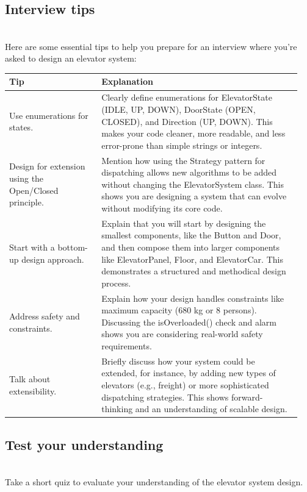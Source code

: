 \subsection{Interview tips}\label{GfHryhjT5altWo7oqo-Nh}
\\
Here are some essential tips to help you prepare for an interview where you're asked to design an elevator system:

\begin{center}
\begin{tabular}{|p{0.3\linewidth}|p{0.65\linewidth}|}
\hline
\textbf{Tip} & \textbf{Explanation} \\
\hline
Use enumerations for states. & Clearly define enumerations for ElevatorState (IDLE, UP, DOWN), DoorState (OPEN, CLOSED), and Direction (UP, DOWN). This makes your code cleaner, more readable, and less error-prone than simple strings or integers. \\
\hline
Design for extension using the Open/Closed principle. & Mention how using the Strategy pattern for dispatching allows new algorithms to be added without changing the ElevatorSystem class. This shows you are designing a system that can evolve without modifying its core code. \\
\hline
Start with a bottom-up design approach. & Explain that you will start by designing the smallest components, like the Button and Door, and then compose them into larger components like ElevatorPanel, Floor, and ElevatorCar. This demonstrates a structured and methodical design process. \\
\hline
Address safety and constraints. & Explain how your design handles constraints like maximum capacity (680 kg or 8 persons). Discussing the isOverloaded() check and alarm shows you are considering real-world safety requirements. \\
\hline
Talk about extensibility. & Briefly discuss how your system could be extended, for instance, by adding new types of elevators (e.g., freight) or more sophisticated dispatching strategies. This shows forward-thinking and an understanding of scalable design. \\
\hline
\end{tabular}
\end{center}


\subsection{Test your understanding}\label{w9HMfXs-YjkGp6pHHON6C}
\\
Take a short quiz to evaluate your understanding of the elevator system design.

